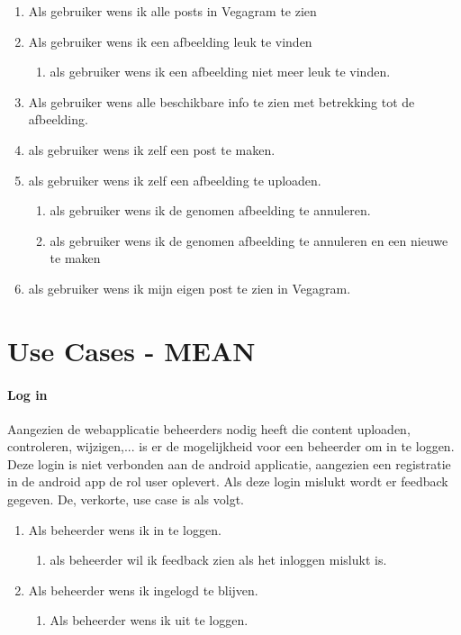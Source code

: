  \begin{enumerate}
	\item Als gebruiker wens ik alle posts in Vegagram te zien
	\item Als gebruiker wens ik een afbeelding leuk te vinden
		\begin{enumerate}
		\item als gebruiker wens ik een afbeelding niet meer leuk te vinden.
	\end{enumerate}
	\item Als gebruiker wens alle beschikbare info te zien met betrekking tot de afbeelding.
	\item als gebruiker wens ik zelf een post te maken.
	\item als gebruiker wens ik zelf een afbeelding te uploaden.
		\begin{enumerate}
		\item als gebruiker wens ik de genomen afbeelding te annuleren.
		\item als gebruiker wens ik de genomen afbeelding te annuleren en een nieuwe te maken
	\end{enumerate}
	\item als gebruiker wens ik mijn eigen post te zien in Vegagram.
\end{enumerate}

\section{Use Cases - MEAN}
\paragraph{Log in}

Aangezien de webapplicatie beheerders nodig heeft die content uploaden, controleren, wijzigen,...
is er de mogelijkheid voor een beheerder om in te loggen. Deze login is niet verbonden aan de 
android applicatie, aangezien een registratie in de android app de rol user oplevert. Als deze 
login mislukt wordt er feedback gegeven. De, verkorte, use case is als volgt.

\begin{enumerate}
	\item Als beheerder wens ik in te loggen.
	\begin{enumerate}
		\item als beheerder wil ik feedback zien als het inloggen mislukt is.
	\end{enumerate}
	\item Als beheerder wens ik ingelogd te blijven.
	\begin{enumerate}
	\item Als beheerder wens ik uit te loggen.
	\end{enumerate}
\end{enumerate}

